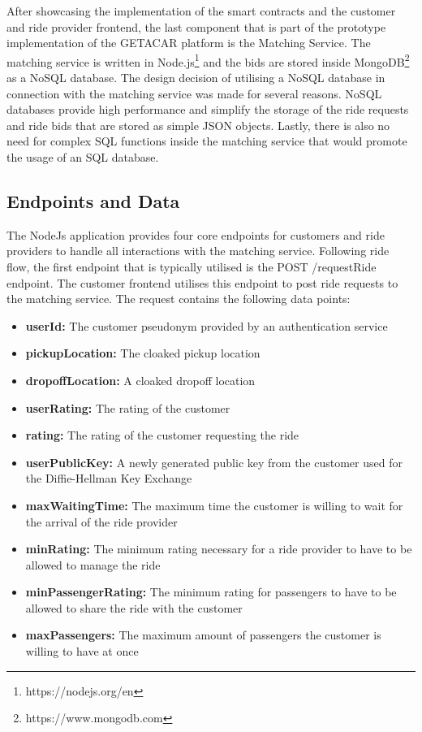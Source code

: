 After showcasing the implementation of the smart contracts and the customer and ride provider frontend, the last component that is part of the prototype implementation of the GETACAR platform is the Matching Service. The matching service is written in Node.js\footnote{https://nodejs.org/en} and the bids are stored inside MongoDB\footnote{https://www.mongodb.com} as a NoSQL database. The design decision of utilising a NoSQL database in connection with the matching service was made for several reasons. NoSQL databases provide high performance and simplify the storage of the ride requests and ride bids that are stored as simple JSON objects. Lastly, there is also no need for complex SQL functions inside the matching service that would promote the usage of an SQL database.


\subsection{Endpoints and Data}
The NodeJs application provides four core endpoints for customers and ride providers to handle all interactions with the matching service. Following ride flow, the first endpoint that is typically utilised is the POST /requestRide endpoint. The customer frontend utilises this endpoint to post ride requests to the matching service. The request contains the following data points:

\begin{itemize}
    \item \textbf{userId:} The customer pseudonym provided by an authentication service
    \item \textbf{pickupLocation:} The cloaked pickup location
    \item \textbf{dropoffLocation:} A cloaked dropoff location
    \item \textbf{userRating:} The rating of the customer
    \item \textbf{rating:} The rating of the customer requesting the ride
    \item \textbf{userPublicKey:} A newly generated public key from the customer used for the Diffie-Hellman Key Exchange
    \item \textbf{maxWaitingTime:} The maximum time the customer is willing to wait for the arrival of the ride provider
    \item \textbf{minRating:} The minimum rating necessary for a ride provider to have to be allowed to manage the ride
    \item \textbf{minPassengerRating:} The minimum rating for passengers to have to be allowed to share the ride with the customer
    \item \textbf{maxPassengers:} The maximum amount of passengers the customer is willing to have at once
\end{itemize}

